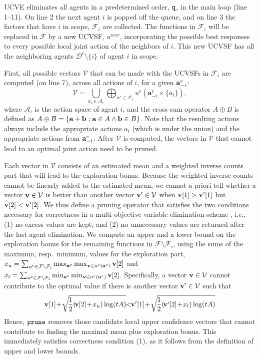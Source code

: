 \documentclass{article}
\begin{document}
UCVE eliminates all agents in a predetermined order, $\tt q$, in the main loop (line 1--11). On line 2 the next agent $i$ is popped off the queue, and on line 3 the factors that have $i$ in scope, $\mathcal{F}_i$ are collected. The functions in $\mathcal{F}_i$ will be replaced in $\mathcal{F}$ by a new UCVSF, $u^{new}$, incorporating the possible best responses to every possible local joint action of the neighbors of $i$. This new UCVSF has all the neighboring agents $\mathcal{D}^e \setminus \{i\}$ of agent $i$ in scope.

First, all possible vectors $\mathcal{V}$ that can be made with the UCVSFs in $\mathcal{F}_i$ are computed (on line 7), across all actions of $i$, for a given ${\bf a}^e_{-i}$:
\[\mathcal{V} = \bigcup_{a_i\in\mathcal{A}_i} \bigoplus_{u^e\in \mathcal{F}_i} u^e(\mathbf{a}^e_{-i} \times \{a_i\}),
\]
where $\mathcal{A}_i$ is the action space of agent $i$, and the cross-sum operator $A \oplus B$ is defined as $A \oplus B = \{ {\bf a} + {\bf b} : {\bf a}\in A \wedge {\bf b} \in B\}$.  Note that the resulting actions always include the appropriate actions $a_i$ (which is under the union) and the appropriate actions from ${\bf a}^e_{-i}$.  After $\mathcal{V}$ is computed, the vectors in $\mathcal{V}$ that cannot lead to an optimal joint action need to be pruned. 

Each vector in $\mathcal{V}$ consists of an estimated mean and a weighted inverse counts part that
will lead to the exploration bonus. Because the weighted inverse counts  cannot be linearly added to
the estimated mean, we cannot a priori tell whether a vector ${\bf v} \in \mathcal{V}$ is better
than  another vector ${\bf v}' \in \mathcal{V}$ when ${\bf v}[1]>{\bf v}'[1]$ but ${\bf v}[2]<{\bf
v}'[2]$. We thus define a pruning operator that satisfies the two conditions necessary for
correctness in a multi-objective variable elimination-scheme \cite{roijersPhD}, i.e., (1) no excess
values are kept, and (2) no unnecessary values are returned after the last agent elimination.
We compute an upper and a lower bound on the exploration bonus for the remaining
functions in $\mathcal{F} \setminus \mathcal{F}_i$, using the sums of the maximum, resp.\ minimum,
values for the exploration part,
$x_u = \sum_{u^e \in \mathcal{F} \setminus \mathcal{F}_i} \max_{{\bf a}^e} \max_{{\bf v}\in u^e({\bf a}^e)} {\bf v}[2]$
and
$x_l = \sum_{u^e \in \mathcal{F} \setminus \mathcal{F}_i} \min_{{\bf a}^e} \min_{{\bf v}\in u^e({\bf a}^e)} {\bf v}[2]$.
Specifically, a vector ${\bf v} \in \mathcal{V}$ cannot contribute to the optimal value if there is another vector ${\bf v}' \in \mathcal{V}$ such that
\[
	{\bf v}[1]\!+\!\sqrt{\!\frac{1}{2}  (\!{\bf v}[2]\!+\!x_u) \log ( t A )}\!\! <\!\! {\bf v}'[1]\!+\! \sqrt{\!\frac{1}{2}  (\!{\bf v}'[2]\!+\!x_l) \log ( t A )}
	\]
Hence, $\tt prune$ removes those candidate local upper confidence vectors that cannot contribute to finding the maximal mean plus exploration bonus. This immediately satisfies correctness condition (1), as it follows from the definition of upper and lower bounds.
\end{document}
